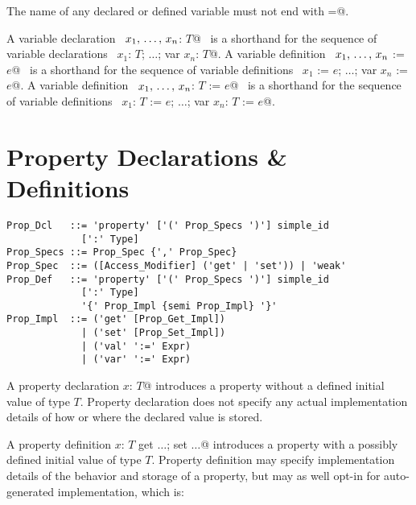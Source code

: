 The name of any declared or defined variable must not end with \lstinline@=@. 

A variable declaration ~\lstinline@var $x_1 ,\, \ldots ,\, x_n$: $T$@~ is a
shorthand for the sequence of variable declarations ~\lstinline@var $x_1$: $T$; $\ldots$; var $x_n$: $T$@. A variable definition ~\lstinline@var $x_1 ,\, \ldots ,\, x_n$ := $e$@~ is a shorthand for the sequence of variable definitions ~\lstinline@var $x_1$ := $e$; $\ldots$; var $x_n$ := $e$@. A variable definition ~\lstinline@var $x_1 ,\, \ldots ,\, x_n$: $T$ := $e$@~ is a shorthand for the sequence of variable definitions ~\lstinline@var $x_1$: $T$ := $e$; $\ldots$; var $x_n$: $T$ := $e$@.

\section{Property Declarations \& Definitions}
\label{sec:property-dec-dfn}

\syntax\begin{lstlisting}
Prop_Dcl   ::= 'property' ['(' Prop_Specs ')'] simple_id 
             [':' Type]
Prop_Specs ::= Prop_Spec {',' Prop_Spec}
Prop_Spec  ::= ([Access_Modifier] ('get' | 'set')) | 'weak'
Prop_Def   ::= 'property' ['(' Prop_Specs ')'] simple_id 
             [':' Type]
             '{' Prop_Impl {semi Prop_Impl} '}'
Prop_Impl  ::= ('get' [Prop_Get_Impl])
             | ('set' [Prop_Set_Impl])
             | ('val' ':=' Expr)
             | ('var' ':=' Expr)
\end{lstlisting} %

A property declaration \lstinline@property $x$: $T$@ introduces a property without a defined initial value of type $T$. Property declaration does not specify any actual implementation details of how or where the declared value is stored.

A property definition \lstinline@property $x$: $T$ {get $\ldots$; set $\ldots$}@ introduces a property with a possibly defined initial value of type $T$. Property definition may specify implementation details of the behavior and storage of a property, but may as well opt-in for auto-generated implementation, which is: 

